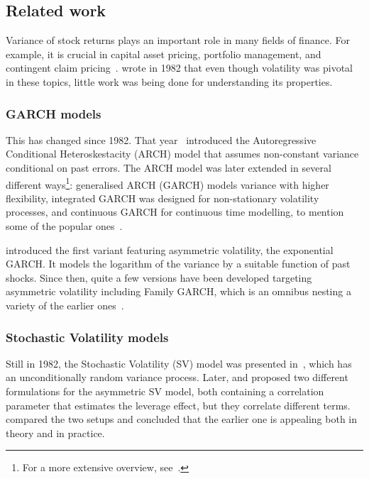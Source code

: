 \subsection{Related work}

Variance of stock returns plays an important role in many fields of finance.
For example, it is crucial in capital asset pricing, portfolio management, and contingent claim pricing~\citep{hull1987pricing,skiadas2009asset,chow2014study}.
\citet{Christie1982} wrote in 1982 that even though volatility was pivotal in these topics, little work was being done for understanding its properties.

\subsubsection*{GARCH models}

This has changed since 1982.
That year~\citet{Engle1982} introduced the Autoregressive Conditional Heteroskestacity (ARCH) model that assumes non-constant variance conditional on past errors.
The ARCH model was later extended in several different ways\footnote{For a more extensive overview, see~\citet{bollerslev1994arch}.}: generalised ARCH (GARCH) models variance with higher flexibility, integrated GARCH was designed for non-stationary volatility processes, and continuous GARCH for continuous time modelling, to mention some of the popular ones~\citep{Bollerslev1986,engle1986modelling,box1994time,kluppelberg2004continuous}.

\citet{Nelson1991} introduced the first variant featuring asymmetric volatility, the exponential GARCH.
It models the logarithm of the variance by a suitable function of past shocks.
Since then, quite a few versions have been developed targeting asymmetric volatility including Family GARCH, which is an omnibus nesting a variety of the earlier ones~\citep{engle1993measuring,glosten1993relation,zakoian1994threshold,sentana1995quadratic,hentschel1995all}.

\subsubsection*{Stochastic Volatility models}

Still in 1982, the Stochastic Volatility (SV) model was presented in~\citet{Taylor1982}, which has an unconditionally random variance process.
Later, \citet{Harvey1996} and \citet{Jacquier2004} proposed two different formulations for the asymmetric SV model, both containing a correlation parameter that estimates the leverage effect, but they correlate different terms.
~\citet{yu2005leverage} compared the two setups and concluded that the earlier one is appealing both in theory and in practice.

